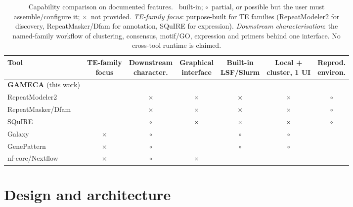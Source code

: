\documentclass[11pt]{article}
\newcommand{\cYes}{\textcolor{green!45!black}{\checkmark}}
\newcommand{\cPart}{\textcolor{orange!85!black}{$\circ$}}
\newcommand{\cNo}{\textcolor{black!30}{$\times$}}
\begin{document}
\begin{table}[h]
  \centering
  \footnotesize
  \setlength{\tabcolsep}{5pt}
  \renewcommand{\arraystretch}{1.2}
  \begin{tabular}{@{}l cccccc@{}}
    \toprule
    \textbf{Tool} &
      \shortstack{TE-family\\focus} &
      \shortstack{Downstream\\character.} &
      \shortstack{Graphical\\interface} &
      \shortstack{Built-in\\LSF/Slurm} &
      \shortstack{Local +\\cluster, 1 UI} &
      \shortstack{Reprod.\\environ.} \\
    \midrule
    \textbf{GAMECA} (this work)          & \cYes & \cYes  & \cYes & \cYes  & \cYes  & \cYes  \\
    RepeatModeler2~\citep{flynn2020}     & \cYes & \cNo   & \cNo  & \cNo   & \cNo   & \cPart \\
    RepeatMasker/Dfam~\citep{hubley2016} & \cYes & \cNo   & \cNo  & \cNo   & \cNo   & \cPart \\
    SQuIRE~\citep{yang2019squire}        & \cYes & \cPart & \cNo  & \cNo   & \cNo   & \cPart \\
    Galaxy~\citep{galaxy2022}            & \cNo  & \cPart & \cYes & \cPart & \cPart & \cYes  \\
    GenePattern~\citep{genepattern2006}  & \cNo  & \cPart & \cYes & \cPart & \cPart & \cYes  \\
    nf-core/Nextflow~\citep{ewels2020}   & \cNo  & \cPart & \cNo  & \cYes  & \cYes  & \cYes  \\
    \bottomrule
  \end{tabular}
  \caption{Capability comparison on documented features. \cYes~built-in;
    \cPart~partial, or possible but the user must assemble/configure it; \cNo~not provided.
    \emph{TE-family focus}: purpose-built for TE families (RepeatModeler2 for discovery,
    RepeatMasker/Dfam for annotation, SQuIRE for expression). \emph{Downstream
    characterisation}: the named-family workflow of clustering, consensus, motif/GO,
    expression and primers behind one interface. No cross-tool runtime is claimed.}
  \label{tab:comparison}
\end{table}

\section{Design and architecture}
\label{sec:arch}
\end{document}

